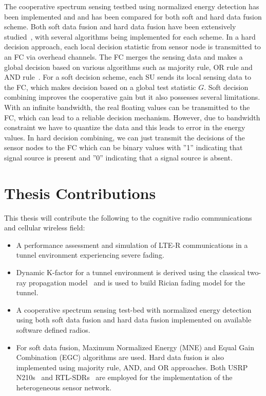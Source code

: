 The cooperative spectrum sensing testbed using normalized energy detection has been implemented and and has been compared for both soft and hard data fusion scheme. Both soft data fusion and hard data fusion have been extensively studied~\cite{arhtn9,inphtn10,arhtn11}, with several algorithms being implemented for each scheme. In a hard decision approach, each local decision statistic from sensor node is transmitted to an FC via overhead channels. The FC merges the sensing data and makes a global decision based on various algorithms such as majority rule, OR rule and AND rule~\cite{inhtn12}. For a soft decision scheme, each SU sends its local sensing data to the FC, which makes decision based on a global test statistic $G$. Soft decision combining improves the cooperative gain but it also possesses several limitations. With an infinite bandwidth, the real floating values can be transmitted to the FC, which can lead to a reliable decision mechanism. However, due to bandwidth constraint we have to quantize the data and this leads to error in the energy values. In hard decision combining, we can just transmit the decisions of the sensor nodes to the FC which can be binary values with ”1” indicating that signal source is present and ”0” indicating that a signal source is absent.
\section{Thesis Contributions}
This thesis will contribute the following to the cognitive radio communications and cellular wireless field:

\begin{itemize}
\item A performance assessment and simulation of LTE-R communications in a tunnel environment experiencing severe fading.

\item Dynamic K-factor for a tunnel environment is derived using the classical two-ray propagation model~\cite{booklter11} and is used to build Rician fading model for the tunnel.

\item A cooperative spectrum sensing test-bed with normalized energy detection using both soft data fusion and hard data fusion implemented on available software defined radios.

\item For soft data fusion, Maximum Normalized Energy (MNE) and Equal Gain Combination (EGC) algorithms are used. Hard data fusion is also implemented using majority rule, AND, and OR approaches. Both USRP N210s~\cite{usrp} and RTL-SDRs~\cite{rtlsdr} are employed for the implementation of the heterogeneous sensor network.
\end{itemize}


